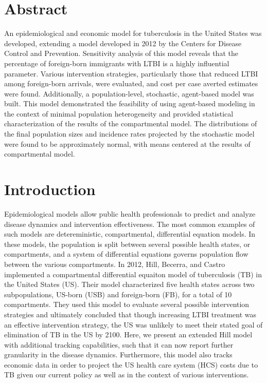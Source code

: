 \documentclass{amsart}
\begin{document}
\section{Abstract}
An epidemiological and economic model for tuberculosis in the United States
 was developed, extending a model developed in 2012 by the Centers
for Disease Control and Prevention. Sensitivity analysis of this model reveals
that the percentage of foreign-born immigrants with LTBI is a highly influential
parameter. Various intervention strategies, particularly those that reduced LTBI
among foreign-born arrivals, were evaluated, and cost per case averted estimates
were found.  Additionally, a population-level, stochastic, agent-based model was
built. This model demonstrated the feasibility of using agent-based modeling in
the context of minimal population heterogeneity and provided statistical
characterization of the results of the compartmental model. The distributions
of the final population sizes and incidence rates projected by the stochastic model
were found to be approximately normal, with means centered at the results of
compartmental model.  

\section{Introduction}
Epidemiological models allow public health professionals to predict and analyze
disease dynamics and intervention effectiveness. The most common examples of
such models are detereministic, compartmental, differential equation models. In
these models, the population is split between several possible health states, or
compartments, and a system of differential equations governs population flow
between the various compartments. In 2012, Hill, Becerra, and Castro implemented
a compartmental differential equaiton model of tuberculosis (TB) in the United
States (US).  Their model characterized five health states across two
subpopulations, US-born (USB) and foreign-born (FB), for a total of 10
compartments. They used this model to evaluate several possible intervention
strategies and ultimately concluded that though increasing LTBI treatment was an
effective intervention strategy, the US was unlikely to meet their stated goal
of elimination of TB in the US by 2100. Here, we present an extended Hill model
with additional tracking capabilities, such that it can now report
further granularity in the disease dynamics. Furthermore, this model also tracks
economic data in order to project the US health care system (HCS) costs due to
TB given our current policy as well as in the context of various interventions. 
\end{document}
